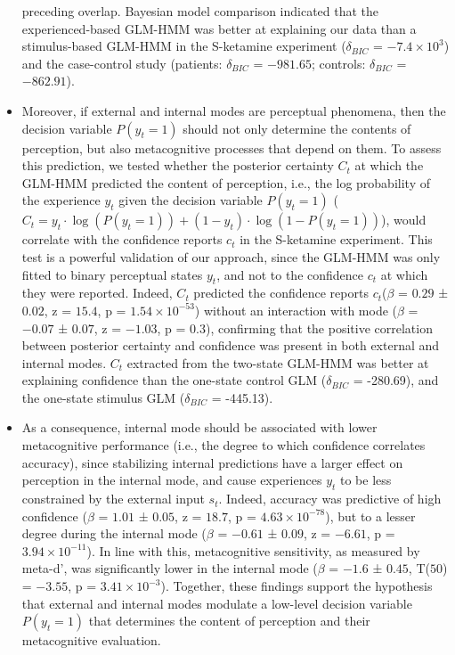 \documentclass[
]{article}
\begin{document}
\begin{itemize}
  preceding overlap. Bayesian model comparison indicated that the
  experienced-based GLM-HMM was better at explaining our data than a
  stimulus-based GLM-HMM in the S-ketamine experiment (\(\delta_{BIC}\)
  = \(\ensuremath{-7.4\times 10^{3}}\)) and the case-control study
  (patients: \(\delta_{BIC}\) = \(-981.65\); controls: \(\delta_{BIC}\)
  = \(-862.91\)).
\item
  Moreover, if external and internal modes are perceptual phenomena,
  then the decision variable \(P(y_t = 1)\) should not only determine
  the contents of perception, but also metacognitive processes that
  depend on them. To assess this prediction, we tested whether the
  posterior certainty \(C_t\) at which the GLM-HMM predicted the content
  of perception, i.e., the log probability of the experience \(y_t\)
  given the decision variable \(P(y_t = 1)\)
  (\(C_t = y_t \cdot \log(P(y_t = 1)) + (1 - y_t) \cdot \log(1 - P(y_t = 1))\)),
  would correlate with the confidence reports \(c_t\) in the S-ketamine
  experiment. This test is a powerful validation of our approach, since
  the GLM-HMM was only fitted to binary perceptual states \(y_t\), and
  not to the confidence \(c_t\) at which they were reported. Indeed,
  \(C_t\) predicted the confidence reports \(c_t\)(\(\beta\) = \(0.29\)
  ± \(0.02\), z = \(15.4\), p = \(\ensuremath{1.54\times 10^{-53}}\))
  without an interaction with mode (\(\beta\) = \(-0.07\) ± \(0.07\), z
  = \(-1.03\), p = \(0.3\)), confirming that the positive correlation
  between posterior certainty and confidence was present in both
  external and internal modes. \(C_t\) extracted from the two-state
  GLM-HMM was better at explaining confidence than the one-state control
  GLM (\(\delta_{BIC}\) = -280.69), and the one-state stimulus GLM
  (\(\delta_{BIC}\) = -445.13).
\item
  As a consequence, internal mode should be associated with lower
  metacognitive performance (i.e., the degree to which confidence
  correlates accuracy), since stabilizing internal predictions have a
  larger effect on perception in the internal mode, and cause
  experiences \(y_t\) to be less constrained by the external input
  \(s_t\). Indeed, accuracy was predictive of high confidence (\(\beta\)
  = \(1.01\) ± \(0.05\), z = \(18.7\), p =
  \(\ensuremath{4.63\times 10^{-78}}\)), but to a lesser degree during
  the internal mode (\(\beta\) = \(-0.61\) ± \(0.09\), z = \(-6.61\), p
  = \(\ensuremath{3.94\times 10^{-11}}\)). In line with this,
  metacognitive sensitivity, as measured by meta-d', was significantly
  lower in the internal mode (\(\beta\) = \(-1.6\) ± \(0.45\), T(\(50\))
  = \(-3.55\), p = \(\ensuremath{3.41\times 10^{-3}}\)). Together, these
  findings support the hypothesis that external and internal modes
  modulate a low-level decision variable \(P(y_t = 1)\) that determines
  the content of perception and their metacognitive evaluation.
\end{itemize}
\end{document}
